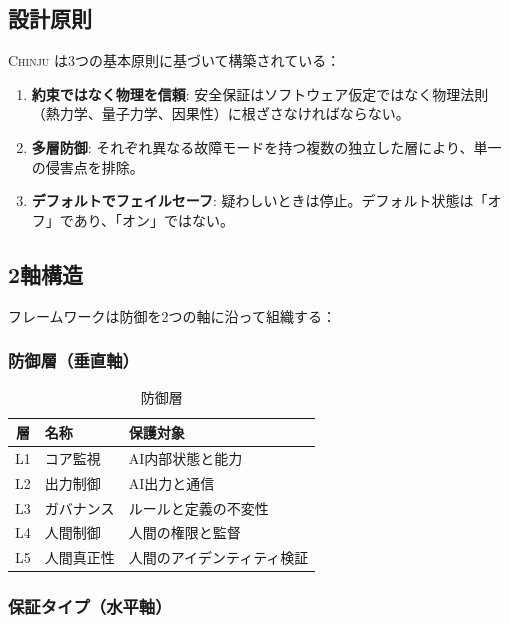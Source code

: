 \documentclass[11pt,a4paper]{article}
\newcommand{\chinju}{\textsc{Chinju}}
\begin{document}
\subsection{設計原則}

\chinju{} は3つの基本原則に基づいて構築されている：

\begin{enumerate}
    \item \textbf{約束ではなく物理を信頼}: 安全保証はソフトウェア仮定ではなく物理法則（熱力学、量子力学、因果性）に根ざさなければならない。

    \item \textbf{多層防御}: それぞれ異なる故障モードを持つ複数の独立した層により、単一の侵害点を排除。

    \item \textbf{デフォルトでフェイルセーフ}: 疑わしいときは停止。デフォルト状態は「オフ」であり、「オン」ではない。
\end{enumerate}

\subsection{2軸構造}

フレームワークは防御を2つの軸に沿って組織する：

\subsubsection{防御層（垂直軸）}

\begin{table}[htbp]
\centering
\caption{防御層}
\label{tab:layers}
\begin{tabular}{@{}clp{6cm}@{}}
\toprule
層 & 名称 & 保護対象 \\
\midrule
L1 & コア監視 & AI内部状態と能力 \\
L2 & 出力制御 & AI出力と通信 \\
L3 & ガバナンス & ルールと定義の不変性 \\
L4 & 人間制御 & 人間の権限と監督 \\
L5 & 人間真正性 & 人間のアイデンティティ検証 \\
\bottomrule
\end{tabular}
\end{table}

\subsubsection{保証タイプ（水平軸）}
\end{document}

